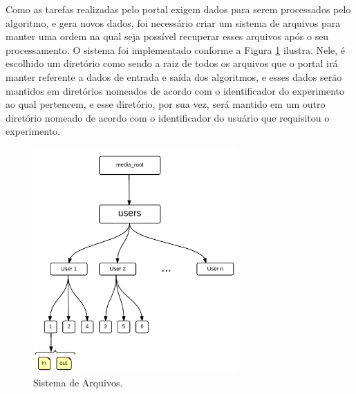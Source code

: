 \documentclass[tg]{mdtufsm}
\begin{document}
Como as tarefas realizadas pelo portal exigem dados para serem processados pelo algoritmo, e gera novos dados, foi necessário criar um sistema de arquivos para manter uma ordem na qual seja possível recuperar esses arquivos após o seu processamento.
O sistema foi implementado conforme a Figura  \ref{fig:filesystem} ilustra. Nele, é escolhido um diretório como sendo a raiz de todos os arquivos que o portal irá manter referente a dados de entrada e saída dos algoritmos, e esses dados serão mantidos em diretórios nomeados de acordo com o identificador do experimento ao qual pertencem, e esse diretório, por sua vez, será mantido em um outro diretório nomeado de acordo com o identificador do usuário que requisitou o experimento.

\begin{figure}
	\centering
	\includegraphics[width=0.7\textwidth]{filesystem}
	\caption{
		Sistema de Arquivos.
	}
	\label{fig:filesystem}
\end{figure}
\end{document}
